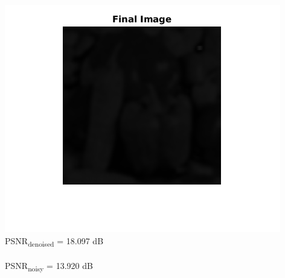 \documentclass{article}
\begin{document}
\includegraphics[scale=0.5]{images/peak30_denoised}
\\
PSNR\textsubscript{denoised} = 18.097 dB\\
\\
PSNR\textsubscript{noisy} = 13.920 dB
\end{document}
